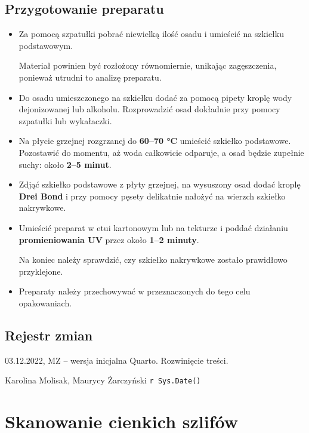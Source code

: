 \documentclass[
  letterpaper,
  DIV=11,
  numbers=noendperiod]{scrreprt}
\begin{document}
\hypertarget{przygotowanie-preparatu}{%
\section{Przygotowanie preparatu}\label{przygotowanie-preparatu}}

\begin{itemize}
\item
  Za pomocą szpatułki pobrać niewielką ilość osadu i umieścić na
  szkiełku podstawowym.

  Materiał powinien być rozłożony równomiernie, unikając zagęszczenia,
  ponieważ utrudni to analizę preparatu.
\item
  Do osadu umieszczonego na szkiełku dodać za pomocą pipety kroplę wody
  dejonizowanej lub alkoholu. Rozprowadzić osad dokładnie przy pomocy
  szpatułki lub wykałaczki.
\item
  Na płycie grzejnej rozgrzanej do \textbf{60--70 °C} umieścić szkiełko
  podstawowe. Pozostawić do momentu, aż woda całkowicie odparuje, a osad
  będzie zupełnie suchy: około \textbf{2--5 minut}.
\item
  Zdjąć szkiełko podstawowe z płyty grzejnej, na wysuszony osad dodać
  kroplę \textbf{Drei Bond} i przy pomocy pęsety delikatnie nałożyć na
  wierzch szkiełko nakrywkowe.
\item
  Umieścić preparat w etui kartonowym lub na tekturze i poddać działaniu
  \textbf{promieniowania UV} przez około \textbf{1--2 minuty}.

  Na koniec należy sprawdzić, czy szkiełko nakrywkowe zostało prawidłowo
  przyklejone.
\item
  Preparaty należy przechowywać w przeznaczonych do tego celu
  opakowaniach.
\end{itemize}

\hypertarget{pagebreak-rejestr-zmian-8}{%
\section{\texorpdfstring{\newpage{}Rejestr
zmian}{Rejestr zmian}}\label{pagebreak-rejestr-zmian-8}}

03.12.2022, MZ -- wersja inicjalna Quarto. Rozwinięcie treści.

Karolina Molisak, Maurycy Żarczyński \texttt{r\ Sys.Date()}

\hypertarget{skanowanie-cienkich-szlifuxf3w}{%
\chapter{Skanowanie cienkich
szlifów}\label{skanowanie-cienkich-szlifuxf3w}}
\end{document}

